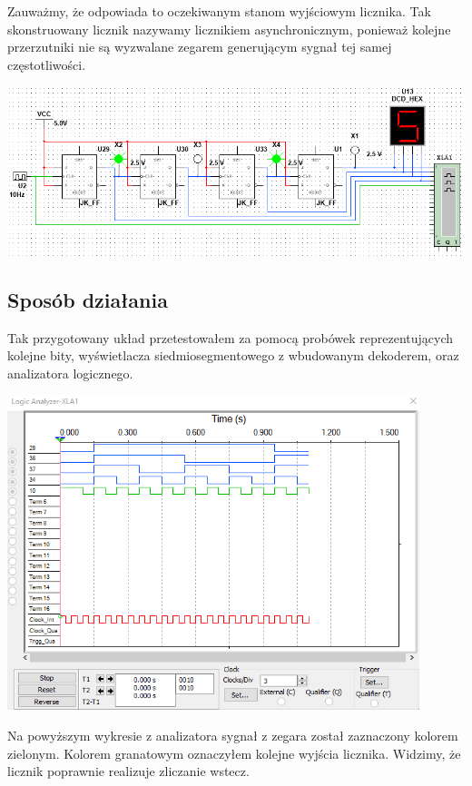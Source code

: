 \documentclass{article}
\begin{document}
            \FloatBarrier
            Zauważmy, że odpowiada to oczekiwanym stanom wyjściowym licznika. Tak skonstruowany licznik nazywamy licznikiem asynchronicznym, ponieważ kolejne przerzutniki nie są wyzwalane zegarem generującym sygnał tej samej częstotliwości. 
            \begin{center}
                \includegraphics[width=18 cm]{reports/img/Z3B_1.png}\\
            \end{center}

        
        \subsection{Sposób działania}
            Tak przygotowany układ przetestowałem za pomocą probówek reprezentujących kolejne bity, wyświetlacza siedmiosegmentowego z wbudowanym dekoderem, oraz analizatora logicznego. 
            \begin{center}
                \includegraphics[width=12cm]{reports/img/Z3B_2.png}\\
            \end{center}
            \FloatBarrier
            Na powyższym wykresie z analizatora sygnał z zegara został zaznaczony kolorem zielonym. Kolorem granatowym oznaczyłem kolejne wyjścia licznika. Widzimy, że licznik poprawnie realizuje zliczanie wstecz.
        
\end{document}
